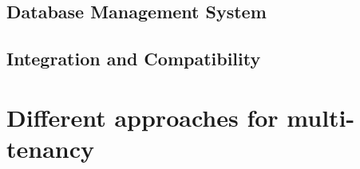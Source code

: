 \subsection{Database Management System}
\label{subsec:dbms}
\subsection{Integration and Compatibility}
\label{subsec:integration-compactibility}
\section{Different approaches for multi-tenancy}
\label{sec:different-approaches-for-multitanency}

